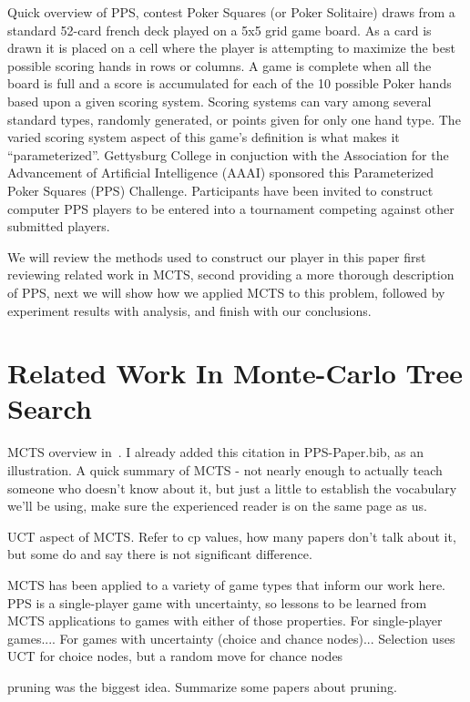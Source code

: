 \documentclass[letterpaper]{article}
\begin{document}
Quick overview of PPS, contest
Poker Squares (or Poker Solitaire) draws from a standard 52-card french deck played on a 5x5 grid game board. As a card is drawn it is placed on a cell where the player is attempting to maximize the best possible scoring hands in rows or columns. A game is complete when all the board is full and a score is accumulated for each of the 10 possible Poker hands based upon a given scoring system. Scoring systems can vary among several standard types, randomly generated, or points given for only one hand type. The varied scoring system aspect of this game's definition is what makes it ``parameterized''. Gettysburg College in conjuction with the Association for the Advancement of Artificial Intelligence (AAAI) sponsored this Parameterized Poker Squares (PPS) Challenge. Participants have been invited to construct computer PPS players to be entered into a tournament competing against other submitted players.

We will review the methods used to construct our player in this paper first reviewing related work in MCTS, second providing a more thorough description of PPS, next we will show how we applied MCTS to this problem, followed by experiment results with analysis, and finish with our conclusions.

\section{Related Work In Monte-Carlo Tree Search}

MCTS overview in~\cite{browne2012survey}. I already added this citation in PPS-Paper.bib, as an illustration.
A quick summary of MCTS - not nearly enough to actually teach someone who doesn't know about it, but just a little to establish the vocabulary we'll be using, make sure the experienced reader is on the same page as us.

UCT aspect of MCTS. Refer to cp values, how many papers don't talk about it, but some do and say there is not significant difference.

MCTS has been applied to a variety of game types that inform our work here. PPS is a single-player game with uncertainty, so lessons to be learned from MCTS applications to games with either of those properties. For single-player games.... For games with uncertainty (choice and chance nodes)... Selection uses UCT for choice nodes, but a random move for chance nodes

pruning was the biggest idea. Summarize some papers about pruning.
\end{document}
